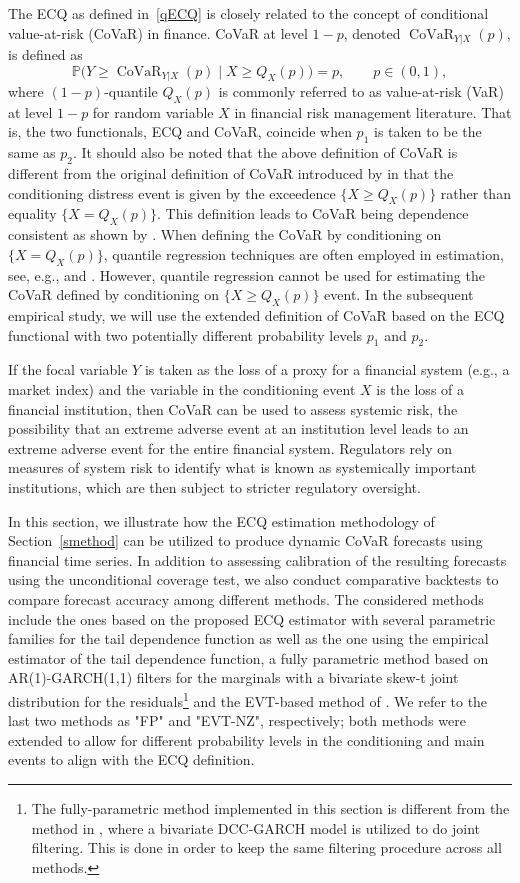 \documentclass[11pt,letterpaper]{article}
\def\bql{\begin{equation}\label}
\def\eql{\end{equation}\noindent}
\DeclareMathOperator{\CoVaR}{CoVaR}
\def\pbb{{\mathbb P}}
\numberwithin{equation}{section}
\begin{document}
The ECQ as defined in~\eqref{qECQ} is closely related to the concept of conditional value-at-risk (CoVaR) in finance. CoVaR at level $1-p$, denoted $\CoVaR_{Y|X}(p)$, is defined as \bql{q1}\pbb\bigl( Y\ge \CoVaR_{Y|X}(p)\mid X\ge Q_X(p)\bigr) = p,\qquad p\in(0,1),\eql
where $(1-p)$-quantile $Q_X(p)$ is commonly referred to as value-at-risk (VaR) at level $1-p$ for random variable $X$ in financial risk management literature. That is, the two functionals, ECQ and CoVaR, coincide when $p_1$ is taken to be the same as $p_2$. It should also be noted that the above definition of CoVaR is different from the original definition of CoVaR introduced by \cite{AdrianBrunnermeier2016} in that the conditioning distress event is given by the exceedence $\bigl\{X\ge Q_X(p)\bigr\}$ rather than equality $\bigl\{X= Q_X(p)\bigr\}$. This definition leads to CoVaR being dependence consistent as shown by \cite{MainikSchaanning2014}. When defining the CoVaR by conditioning on $\bigl\{X= Q_X(p)\bigr\}$, quantile regression techniques are often employed in estimation, see, e.g., \cite{AdrianBrunnermeier2016} and \cite{Leng_etal2024}. However, quantile regression cannot be used for estimating the CoVaR defined by conditioning on $\{X\ge Q_X(p)\bigr\}$ event. In the subsequent empirical study, we will use the extended definition of CoVaR based on the ECQ functional with two potentially different probability levels $p_1$ and $p_2$.



If the focal variable $Y$ is taken as the loss of a proxy for a financial system (e.g.,  a market index) and the variable in the conditioning event $X$ is the loss of a financial institution, then CoVaR can be used to assess systemic risk, the possibility that an extreme adverse event at an institution level leads to an extreme adverse event for the entire financial system. Regulators rely on measures of system risk to identify what is known as systemically important institutions, which are then subject to stricter regulatory oversight. 

In this section, we illustrate how the ECQ estimation methodology of Section~\ref{smethod} can be utilized to produce dynamic CoVaR forecasts using financial time series. In addition to assessing calibration of the resulting forecasts using the unconditional coverage test, we also conduct comparative backtests to compare forecast accuracy among different methods. The considered methods include the ones based on the proposed ECQ estimator with several parametric families for the tail dependence function as well as the one using the empirical estimator of the tail dependence function, a fully parametric method based on AR(1)-GARCH(1,1) filters for the marginals with a bivariate skew-t joint distribution for the residuals\footnote{The fully-parametric method implemented in this section is different from the method in \cite{Girardi2013}, where a bivariate DCC-GARCH model is utilized to do joint filtering. This is done in order to keep the same filtering procedure across all methods. } and the EVT-based method of \cite{NoldeZhang2018}. We refer to the last two methods as  "FP" and "EVT-NZ", respectively; both methods were extended to allow for different probability levels in the conditioning and main events to align with the ECQ definition.
\end{document}
